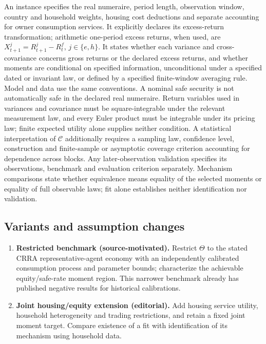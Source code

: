 \documentclass[11pt,a4paper]{article}
\begin{document}
An instance specifies the real numeraire, period length, observation window, country and household weights, housing cost deductions and separate accounting for owner consumption services. It explicitly declares its excess-return transformation; arithmetic one-period excess returns, when used, are \(X^j_{t+1}=R^j_{t+1}-R^f_t\), \(j\in\{e,h\}\). It states whether each variance and cross-covariance concerns gross returns or the declared excess returns, and whether moments are conditional on specified information, unconditional under a specified dated or invariant law, or defined by a specified finite-window averaging rule. Model and data use the same conventions. A nominal safe security is not automatically safe in the declared real numeraire. Return variables used in variances and covariance must be square-integrable under the relevant measurement law, and every Euler product must be integrable under its pricing law; finite expected utility alone supplies neither condition. A statistical interpretation of \(\mathcal C\) additionally requires a sampling law, confidence level, construction and finite-sample or asymptotic coverage criterion accounting for dependence across blocks. Any later-observation validation specifies its observations, benchmark and evaluation criterion separately. Mechanism comparisons state whether equivalence means equality of the selected moments or equality of full observable laws; fit alone establishes neither identification nor validation.
\subsection*{Variants and assumption changes}
\begin{enumerate}
\item \textbf{Restricted benchmark (source-motivated).} Restrict \(\Theta\) to the stated CRRA representative-agent economy with an independently calibrated consumption process and parameter bounds; characterize the achievable equity/safe-rate moment region. This narrower benchmark already has published negative results for historical calibrations.
\item \textbf{Joint housing/equity extension (editorial).} Add housing service utility, household heterogeneity and trading restrictions, and retain a fixed joint moment target. Compare existence of a fit with identification of its mechanism using household data.
\end{enumerate}
\end{document}

